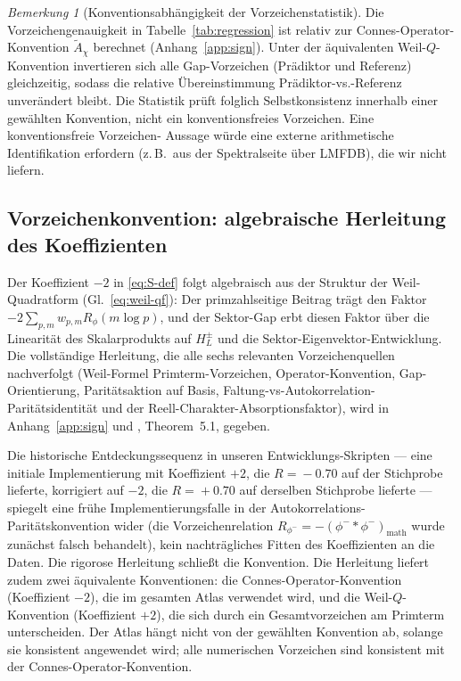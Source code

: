 \documentclass[10pt,twocolumn]{article}
\theoremstyle{definition}
\theoremstyle{remark}
\newtheorem{remark}[theorem]{Bemerkung}
\begin{document}
\begin{remark}[Konventionsabhängigkeit der Vorzeichenstatistik]
\label{rem:sign-convention-dependence}
Die Vorzeichengenauigkeit in Tabelle~\ref{tab:regression} ist relativ
zur Connes-Operator-Konvention $\tilde{A}_\chi$ berechnet
(Anhang~\ref{app:sign}). Unter der äquivalenten Weil-$Q$-Konvention
invertieren sich alle Gap-Vorzeichen (Prädiktor und Referenz)
gleichzeitig, sodass die relative Übereinstimmung
Prädiktor-vs.-Referenz unverändert bleibt. Die Statistik prüft
folglich Selbstkonsistenz innerhalb einer gewählten Konvention, nicht
ein konventionsfreies Vorzeichen. Eine konventionsfreie Vorzeichen-
Aussage würde eine externe arithmetische Identifikation erfordern
(z.\,B.\ aus der Spektralseite über LMFDB), die wir nicht liefern.
\end{remark}

\subsection{Vorzeichenkonvention: algebraische Herleitung des Koeffizienten}
\label{sec:discussion-sign}

Der Koeffizient $-2$ in \eqref{eq:S-def} folgt algebraisch aus der
Struktur der Weil-Quadratform (Gl.~\eqref{eq:weil-qf}): Der primzahlseitige
Beitrag trägt den Faktor $-2\sum_{p,m}w_{p,m}R_\phi(m\log p)$, und der
Sektor-Gap erbt diesen Faktor über die Linearität des Skalarprodukts auf
$H_L^\pm$ und die Sektor-Eigenvektor-Entwicklung. Die vollständige Herleitung,
die alle sechs relevanten Vorzeichenquellen nachverfolgt
(Weil-Formel Primterm-Vorzeichen, Operator-Konvention,
Gap-Orientierung, Paritätsaktion auf Basis, Faltung-vs-Autokorrelation-
Paritätsidentität und der Reell-Charakter-Absorptionsfaktor), wird in
Anhang~\ref{app:sign} und \cite{AnalyticKernelV2}, Theorem~5.1, gegeben.

Die historische Entdeckungssequenz in unseren Entwicklungs-Skripten ---
eine initiale Implementierung mit Koeffizient $+2$, die $R\!=\!-0.70$ auf
der Stichprobe lieferte, korrigiert auf $-2$, die $R\!=\!+0.70$ auf
derselben Stichprobe lieferte --- spiegelt eine frühe Implementierungsfalle
in der Autokorrelations-Paritätskonvention wider (die Vorzeichenrelation
$R_{\phi^-}=-(\phi^-{*}\phi^-)_{\mathrm{math}}$ wurde zunächst falsch
behandelt), kein nachträgliches Fitten des Koeffizienten an die Daten.
Die rigorose Herleitung schließt die Konvention. Die Herleitung liefert
zudem zwei äquivalente Konventionen: die Connes-Operator-Konvention
(Koeffizient $-2$), die im gesamten Atlas verwendet wird, und die
Weil-$Q$-Konvention (Koeffizient $+2$), die sich durch ein Gesamtvorzeichen
am Primterm unterscheiden. Der Atlas hängt nicht von der gewählten Konvention
ab, solange sie konsistent angewendet wird; alle numerischen Vorzeichen sind
konsistent mit der Connes-Operator-Konvention.
\end{document}
